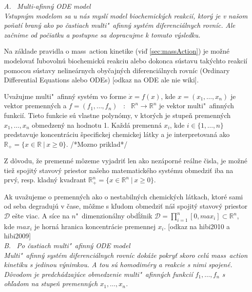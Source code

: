 \documentclass[11pt,final,oneside]{fithesis}
\begin{document}
\it A. \ Multi-afinn\'y ODE model\rm
\\

Vstupn\'ym modelom sa u n\'as mysl\'i model biochemick\'ych reakci\'i, ktor\'y je v na\v som po\v nat\'i bran\'y ako po \v castiach 
multi"~afinn\'y syst\'em diferenci\'alnych rovn\'ic. Ale za\v cnime od po\v ciatku a postupne sa dopracujme k tomuto v\'ysledku.

Na z\'aklade pravidla o mass~action kinetike (vi\v d \ref{sec:massAction}) je mo\v zn\'e modelova\v t \v lubovoln\'u biochemick\'u reakciu alebo dokonca 
s\'ustavu tak\'ychto reakci\'i pomocou s\'ustavy neline\'arnych oby\v cajn\'ych diferenci\'alnych rovn\'ic 
(Ordinary Differential Equations alebo ODEs) [odkaz na ODE ale nie wiki].

Uva\v zujme multi"~afinn\'y syst\'em vo forme $\dot{x} = f(x)$, kde $x = (x_1,\dots{},x_n)$ je vektor premenn\'ych a $f = (f_1,\dots{},f_n)$ \ : \ 
$\mathbb{R}^n \rightarrow \mathbb{R}^n$ je vektor multi"~afin\-n\'ych funkci\'i. Tieto funkcie s\'u vlastne polyn\'omy, v ktor\'ych je stupe\v n premenn\'ych 
$x_1,\dots{},x_n$ obmedzen\'y na hodnotu 1. Ka\v zd\'a premenn\'a $x_i$, kde $i \in \{1,\dots{},n\}$ predstavuje koncentr\'aciu \v specifickej chemickej l\'atky a je interpretovan\'a ako
{$\mathbb{R}_+ = \lbrace{}  x \in \mathbb{R}\ |\ {}x \geq 0  \rbrace$}. /*Mozno priklad*/

Z d\^ ovodu, \v ze premenn\'e m\^ ozeme vyjadri\v t len ako nez\'aporn\'e re\'alne \v cisla, je mo\v zn\'e tie\v z spojit\'y stavov\'y priestor na\v seho 
matematick\'eho syst\'emu obmedzi\v t iba na prv\'y, resp. kladn\'y kvadrant {$\mathbb{R}_+^n = \lbrace{}  x \in \mathbb{R}^n\ |\ {}x \geq 0  \rbrace$}.

Ak uva\v zujeme o premenn\'ych ako o nestabiln\'ych chemick\'ych l\'atkach, ktor\'e sami od seba degraduj\'u v \v case, m\^ o\v zme s k\v ludom obmedzi\v t 
n\'a\v s spojit\'y stavov\'y priestor $\mathcal{D}$ e\v ste viac. A s\'ice na $n$"~dimenzion\'alny obd\'l\v znik $\mathcal{D} = \prod_{i=1}^n[0,max_i] 
\subset \mathbb{R}^n$, kde $max_i$ je horn\'a hranica koncentr\'acie pre\-men\-nej $x_i$. [odkaz na hibi2010 a hibi2009]
\\

\noindent
\it B. \ Po \v castiach multi"~afinn\'y ODE model\rm
\\

Multi"~afinn\'y syst\'em diferenci\'alnych rovn\'ic dok\'a\v ze pokry\v t skoro cel\'u mass~action kinetiku s jedinou v\'ynimkou. A tou s\'u 
homodim\'ery a reakcie s nimi spojen\'e. D\^ ovodom je predch\'adzaj\'uce obmedzenie multi"~afinn\'ych funkci\'i $f_1,\dots{},f_n$ s oh\v ladom 
na stupe\v n premenn\'ych $x_1,\dots{},x_n$.
\end{document}
